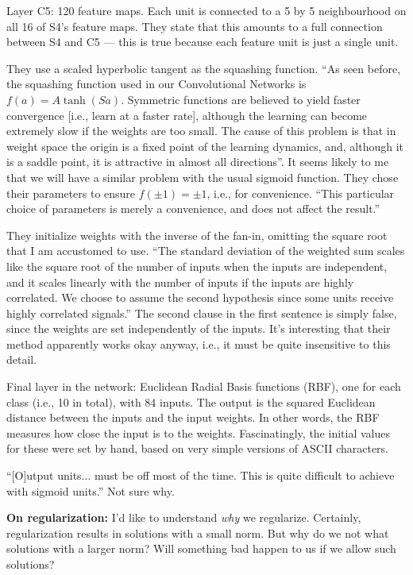 \documentclass[12pt]{article}
\begin{document}
Layer C5: 120 feature maps.  Each unit is connected to a 5 by 5
neighbourhood on all 16 of S4's feature maps.  They state that this
amounts to a full connection between S4 and C5 --- this is true
because each feature unit is just a single unit.

They use a scaled hyperbolic tangent as the squashing function.  ``As
seen before, the squashing function used in our Convolutional Networks
is $f(a) = A \tanh(Sa)$.  Symmetric functions are believed to yield
faster convergence [i.e., learn at a faster rate], although the
learning can become extremely slow if the weights are too small.  The
cause of this problem is that in weight space the origin is a fixed
point of the learning dynamics, and, although it is a saddle point, it
is attractive in almost all directions''. It seems likely to me that
we will have a similar problem with the usual sigmoid function.  They
chose their parameters to ensure $f(\pm 1) = \pm 1$, i.e., for
convenience.  ``This particular choice of parameters is merely a
convenience, and does not affect the result.''

They initialize weights with the inverse of the fan-in, omitting the
square root that I am accustomed to use.  ``The standard deviation of
the weighted sum scales like the square root of the number of inputs
when the inputs are independent, and it scales linearly with the
number of inputs if the inputs are highly correlated.  We choose to
assume the second hypothesis since some units receive highly
correlated signals.''  The second clause in the first sentence is
simply false, since the weights are set independently of the inputs.
It's interesting that their method apparently works okay anyway, i.e.,
it must be quite insensitive to this detail.

Final layer in the network: Euclidean Radial Basis functions (RBF),
one for each class (i.e., 10 in total), with 84 inputs.  The output is
the squared Euclidean distance between the inputs and the input
weights.  In other words, the RBF measures how close the input is to
the weights.  Fascinatingly, the initial values for these were set by
hand, based on very simple versions of ASCII characters.

``[O]utput units... must be off most of the time.  This is quite
difficult to achieve with sigmoid units.''  Not sure why. 



\textbf{On regularization:} I'd like to understand \emph{why} we
regularize.  Certainly, regularization results in solutions with a
small norm.  But why do we not what solutions with a larger norm?
Will something bad happen to us if we allow such solutions?
\end{document}
